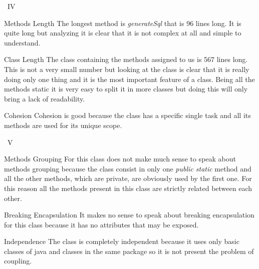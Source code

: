 \documentclass[9pt]{beamer}
\makeatletter
\newcommand*{\currentname}{\@currentlabelname}
\makeatother
\begin{document}
\begin{frame}{\currentname \ IV}

\begin{exampleblock}{Methods Length}
The longest method is \emph{generateSql} that is 96 lines long. It is quite long but analyzing it is clear that it is not complex at all and simple to understand. 
\end{exampleblock}

\vfill

\begin{exampleblock}{Class Length}
The class containing the methods assigned to us is 567 lines long. This is not a very small number but looking at the class is clear that it is really doing only one thing and it is the most important feature of a class. Being all the methods static it is very easy to split it in more classes but doing this will only bring a lack of readability.
\end{exampleblock}

\vfill

\begin{exampleblock}{Cohesion}
Cohesion is good because the class has a specific single task and all its methods are used for its unique scope.
\end{exampleblock}

\end{frame}
\begin{frame}{\currentname \ V}

\begin{block}{Methods Grouping}
For this class does not make much sense to speak about methods grouping because the class consist in only one \emph{public static} method and all the other methods, which are private, are obviously used by the first one. For this reason all the methods present in this class are strictly related between each other.
\end{block}

\vfill

\begin{block}{Breaking Encapsulation}
It makes no sense to speak about breaking encapsulation for this class because it has no attributes that may be exposed.
\end{block}

\vfill
\begin{exampleblock}{Independence}
The class is completely independent because it uses only basic classes of java and classes in the same package so it is not present the problem of coupling.
\end{exampleblock}

\end{frame}
\end{document}
